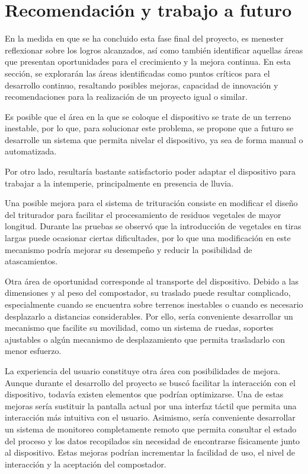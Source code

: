 
\section{Recomendación y trabajo a futuro}

En la medida en que se ha concluido esta fase final del proyecto, es menester reflexionar sobre los logros alcanzados, así como también identificar aquellas áreas que presentan oportunidades para el crecimiento y la mejora continua. En esta sección, se explorarán las áreas identificadas como puntos críticos para el desarrollo continuo, resaltando posibles mejoras, capacidad de innovación y recomendaciones para la realización de un proyecto igual o similar.

Es posible que el área en la que se coloque el dispositivo se trate de un terreno inestable, por lo que, para solucionar este problema, se propone que a futuro se desarrolle un sistema que permita nivelar el dispositivo, ya sea de forma manual o automatizada.

Por otro lado, resultaría bastante satisfactorio poder adaptar el dispositivo para trabajar a la intemperie, principalmente en presencia de lluvia.

Una posible mejora para el sistema de trituración consiste en modificar el diseño del triturador para facilitar el procesamiento de residuos vegetales de mayor longitud. Durante las pruebas se observó que la introducción de vegetales en tiras largas puede ocasionar ciertas dificultades, por lo que una modificación en este mecanismo podría mejorar su desempeño y reducir la posibilidad de atascamientos.

Otra área de oportunidad corresponde al transporte del dispositivo. Debido a las dimensiones y al peso del compostador, su traslado puede resultar complicado, especialmente cuando se encuentra sobre terrenos inestables o cuando es necesario desplazarlo a distancias considerables. Por ello, sería conveniente desarrollar un mecanismo que facilite su movilidad, como un sistema de ruedas, soportes ajustables o algún mecanismo de desplazamiento que permita trasladarlo con menor esfuerzo.

La experiencia del usuario constituye otra área con posibilidades de mejora. Aunque durante el desarrollo del proyecto se buscó facilitar la interacción con el dispositivo, todavía existen elementos que podrían optimizarse. Una de estas mejoras sería sustituir la pantalla actual por una interfaz táctil que permita una interacción más intuitiva con el usuario. Asimismo, sería conveniente desarrollar un sistema de monitoreo completamente remoto que permita consultar el estado del proceso y los datos recopilados sin necesidad de encontrarse físicamente junto al dispositivo. Estas mejoras podrían incrementar la facilidad de uso, el nivel de interacción y la aceptación del compostador. 

